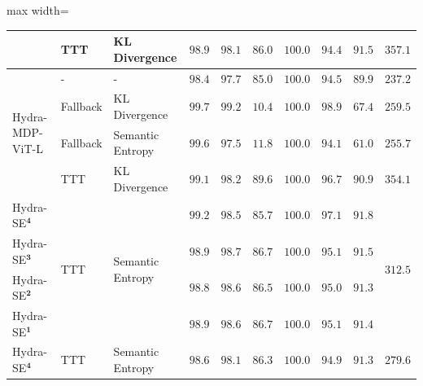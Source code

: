 \begin{table}
\begin{adjustbox}{max width=\linewidth}
\begin{tabular}{l|ll|rrrr|rr|c}
    & TTT & KL Divergence & $98.9$ & $98.1$ & $86.0$ & $100.0$ & $94.4$ & $91.5$ & $357.1$ \\
    \midrule
    \multirow{4}{*}{Hydra-MDP-ViT-L} & - & - & $98.4$ & $97.7$ & $85.0$ & $100.0$ & $94.5$ & $89.9$ & $237.2$ \\
    & Fallback & KL Divergence & $99.7$ & $99.2$ & $10.4$ & $100.0$ & $98.9$ & $67.4$ & $259.5$ \\
    & Fallback & Semantic Entropy & $99.6$ & $97.5$ & $11.8$ & $100.0$ & $94.1$ & $61.0$ & $255.7$ \\
    & TTT & KL Divergence & $99.1$ & $98.2$ & $89.6$ & $100.0$ & $96.7$ & $90.9$ & $354.1$ \\
    \midrule
    Hydra-SE$^{\mathbf{4}}$ & \multirow{4}{*}{TTT} & \multirow{4}{*}{Semantic Entropy} & $99.2$ & $98.5$ & $85.7$ & $100.0$ & $97.1$ & $91.8$ & \multirow{4}{*}{$312.5$} \\
    Hydra-SE$^{\mathbf{3}}$ & & & $98.9$ & $98.7$ & $86.7$ & $100.0$ & $95.1$ & $91.5$ & \\
    Hydra-SE$^{\mathbf{2}}$ & & & $98.8$ & $98.6$ & $86.5$ & $100.0$ & $95.0$ & $91.3$ & \\
    Hydra-SE$^{\mathbf{1}}$ & & & $98.9$ & $98.6$ & $86.7$ & $100.0$ & $95.1$ & $91.4$ & \\
    \midrule
    \rowcolor{gray!50} Hydra-SE$^{\mathbf{4}}$ & TTT & Semantic Entropy & $98.6$ & $98.1$ & $86.3$ & $100.0$ & $94.9$ & $91.3$ & $279.6$ \\
    \bottomrule
  \end{tabular}
  \end{adjustbox}
\end{table}

